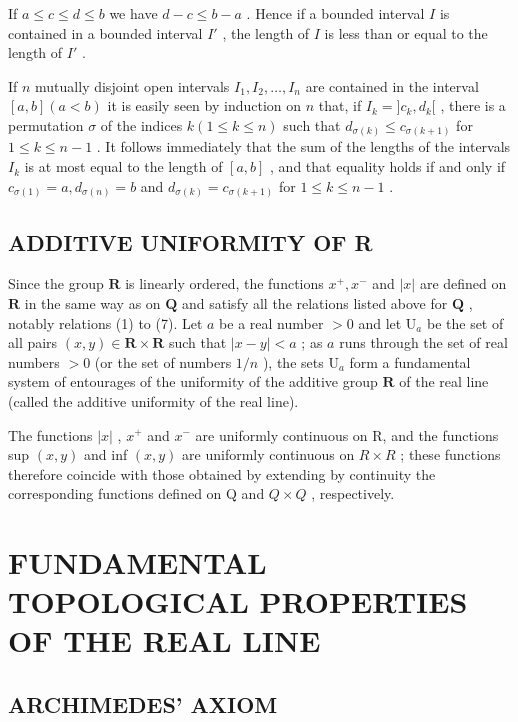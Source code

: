 If \(a \leqslant c \leqslant d \leqslant b\) we have \(d - c \leqslant b - a\) . Hence if a bounded interval \(I\) is contained in a bounded interval \(I'\) , the length of \(I\) is less than or equal to the length of \(I'\) .

If \(n\) mutually disjoint open intervals \(I_1, I_2, \ldots, I_n\) are contained in the interval \([a, b] (a < b)\) it is easily seen by induction on \(n\) that, if \(I_k = ]c_k, d_k[\) , there is a permutation \(\sigma\) of the indices \(k (1 \leqslant k \leqslant n)\) such that \(d_{\sigma(k)} \leqslant c_{\sigma(k+1)}\) for \(1 \leqslant k \leqslant n - 1\) . It follows immediately that the sum of the lengths of the intervals \(I_k\) is at most equal to the length of \([a, b]\) , and that equality holds if and only if \(c_{\sigma(1)} = a, d_{\sigma(n)} = b\) and \(d_{\sigma(k)} = c_{\sigma(k+1)}\) for \(1 \leqslant k \leqslant n - 1\) .

\subsection{ADDITIVE UNIFORMITY OF R}

Since the group \(\mathbf{R}\) is linearly ordered, the functions \(x^{+}, x^{-}\) and \(|x|\) are defined on \(\mathbf{R}\) in the same way as on \(\mathbf{Q}\) and satisfy all the relations listed above for \(\mathbf{Q}\) , notably relations (1) to (7). Let \(a\) be a real number \(>0\) and let \(\mathrm{U}_{a}\) be the set of all pairs \((x, y) \in \mathbf{R} \times \mathbf{R}\) such that \(|x - y| < a\) ; as \(a\) runs through the set of real numbers \(>0\) (or the set of numbers \(1/n\) ), the sets \(\mathrm{U}_{a}\) form a fundamental system of entourages of the uniformity of the additive group \(\mathbf{R}\) of the real line (called the additive uniformity of the real line).

The functions \(|x|\) , \(x^{+}\) and \(x^{-}\) are uniformly continuous on R, and the functions sup \((x, y)\) and inf \((x, y)\) are uniformly continuous on \(R \times R\) ; these functions therefore coincide with those obtained by extending by continuity the corresponding functions defined on Q and \(Q \times Q\) , respectively.

\section{FUNDAMENTAL TOPOLOGICAL PROPERTIES OF THE REAL LINE}

\subsection{ARCHIMEDES' AXIOM}

